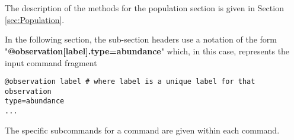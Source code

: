 \section{\label{syntax:Population}}

The description of the methods for the population section is given in Section \ref{sec:Population}.

In the following section, the sub-section headers use a notation of the form "\textbf {@observation[label].type=abundance}" which, in this case, represents the input command fragment
{\small{\begin{verbatim}
@observation label # where label is a unique label for that observation
type=abundance
...
\end{verbatim}}}
The specific subcommands for a command are given within each command.

\subsection{}
\ifAgeBased

\else

\fi

\subsection{}


\subsection{}
\ifAgeBased

\else

\fi

\subsection{}


\subsection{}
\ifAgeBased

\else

\fi 

\subsection{}


